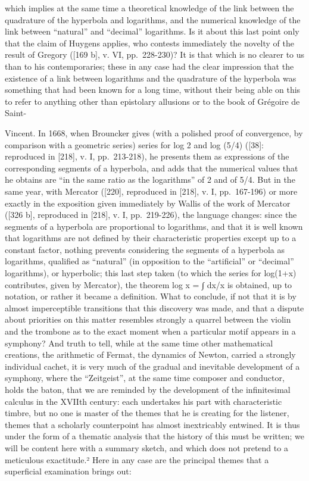 which implies at the same time a theoretical knowledge of the link between the quadrature of the hyperbola and logarithms, and the numerical knowledge of the link between ``natural'' and ``decimal'' logarithms. Is it about this last point only that the claim of Huygens applies, who contests immediately the novelty of the result of Gregory ({[}169 b{]}, v. VI, pp.~228-230)? It is that which is no clearer to us than to his contemporaries; these in any case had the clear impression that the existence of a link between logarithms and the quadrature of the hyperbola was something that had been known for a long time, without their being able on this to refer to anything other than epistolary allusions or to the book of Grégoire de Saint-

Vincent. In 1668, when Brouncker gives (with a polished proof of convergence, by comparison with a geometric series) series for log 2 and log (5/4) ({[}38{]}: reproduced in {[}218{]}, v. I, pp.~213-218), he presents them as expressions of the corresponding segments of a hyperbola, and adds that the numerical values that he obtains are ``in the same ratio as the logarithms'' of 2 and of 5/4. But in the same year, with Mercator ({[}220{]}, reproduced in {[}218{]}, v. I, pp.~167-196) or more exactly in the exposition given immediately by Wallis of the work of Mercator ({[}326 b{]}, reproduced in {[}218{]}, v. I, pp.~219-226), the language changes: since the segments of a hyperbola are proportional to logarithms, and that it is well known that logarithms are not defined by their characteristic properties except up to a constant factor, nothing prevents considering the segments of a hyperbola as logarithms, qualified as ``natural'' (in opposition to the ``artificial'' or ``decimal'' logarithms), or hyperbolic; this last step taken (to which the series for log(1+x) contributes, given by Mercator), the theorem log x = ∫ dx/x is obtained, up to notation, or rather it became a definition. What to conclude, if not that it is by almost imperceptible transitions that this discovery was made, and that a dispute about priorities on this matter resembles strongly a quarrel between the violin and the trombone as to the exact moment when a particular motif appears in a symphony? And truth to tell, while at the same time other mathematical creations, the arithmetic of Fermat, the dynamics of Newton, carried a strongly individual cachet, it is very much of the gradual and inevitable development of a symphony, where the ``Zeitgeist'', at the same time composer and conductor, holds the baton, that we are reminded by the development of the infinitesimal calculus in the XVIIth century: each undertakes his part with characteristic timbre, but no one is master of the themes that he is creating for the listener, themes that a scholarly counterpoint has almost inextricably entwined. It is thus under the form of a thematic analysis that the history of this must be written; we will be content here with a summary sketch, and which does not pretend to a meticulous exactitude.² Here in any case are the principal themes that a superficial examination brings out:

